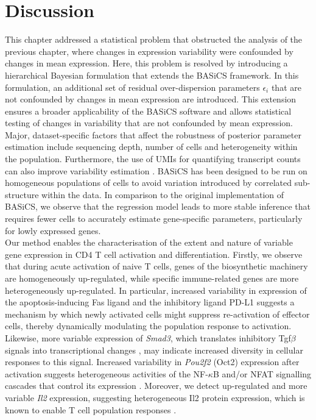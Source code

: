 
\section{Discussion}

This chapter addressed a statistical problem that obstructed the analysis of the previous chapter, where changes in expression variability were confounded by changes in mean expression. Here, this problem is resolved by introducing a hierarchical Bayesian formulation that extends the BASiCS framework. In this formulation, an additional set of residual over-dispersion parameters $\epsilon_i$ that are not confounded by changes in mean expression are introduced. This extension ensures a broader applicability of the BASiCS software and allows statistical testing of changes in variability that are not confounded by mean expression.  \\ 

Major, dataset-specific factors that affect the robustness of posterior parameter estimation include sequencing depth, number of cells and heterogeneity within the population. Furthermore, the use of UMIs for quantifying transcript counts can also improve variability estimation \citep{Grun2014}. BASiCS has been designed to be run on homogeneous populations of cells to avoid variation introduced by correlated sub-structure within the data. In comparison to the original implementation of BASiCS, we observe that the regression model leads to more stable inference that requires fewer cells to accurately estimate gene-specific parameters, particularly for lowly expressed genes. \\

Our method enables the characterisation of the extent and nature of variable gene expression in CD4\plus{} T cell activation and differentiation. Firstly, we observe that during acute activation of naive T cells, genes of the biosynthetic machinery are homogeneously up-regulated, while specific immune-related genes are more heterogeneously up-regulated. In particular, increased variability in expression of the apoptosis-inducing Fas ligand \citep{Strasser2009} and the inhibitory ligand PD-L1 \citep{Chikuma2016} suggests a mechanism by which newly activated cells might suppress re-activation of effector cells, thereby dynamically modulating the population response to activation. Likewise, more variable expression of \emph{Smad3}, which translates inhibitory \gls{Tgf}$\beta$ signals into transcriptional changes \citep{Delisle2013}, may indicate increased diversity in cellular responses to this signal. Increased variability in \textit{Pou2f2} (Oct2) expression after activation suggests heterogeneous activities of the NF-$\kappa$B and/or \gls{NFAT} signalling cascades that control its expression \citep{Mueller2013}.
Moreover, we detect up-regulated and more variable \textit{Il2} expression, suggesting heterogeneous Il2 protein expression, which is known to enable T cell population responses \citep{Fuhrmann2016}. 

